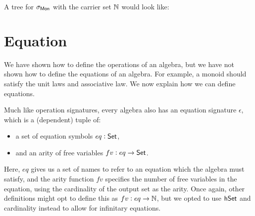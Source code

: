 \begin{example}
A tree for $\sigma_{\mathsf{Mon}}$ with the carrier set $\mathbb{N}$ would look like:
\begin{center}
\hspace{2em}
\end{center}
\end{example}

\section{Equation}\label{sec:universal-algebra:equations}
We have shown how to define the operations of an algebra, but we have not
shown how to define the equations of an algebra. For example, a monoid
should satisfy the unit laws and associative law. We now explain how
we can define equations.

Much like operation signatures, every algebra also has an equation signature
$\epsilon$, which is a (dependent) tuple of:
\begin{itemize}
    \item a set of equation symbols $eq : \mathsf{Set}$,
    \item and an arity of free variables $fv : eq \to \mathsf{Set}$.
\end{itemize}

Here, $eq$ gives us a set of names to refer to an equation which
the algebra must satisfy, and the arity function $fv$ specifies the 
number of free variables in the equation, using the cardinality of the
output set as the arity. Once again, other definitions might opt to
define this as $fv : eq \to \mathbb{N}$, but we opted to use $\mathsf{hSet}$ and
cardinality instead to allow for infinitary equations.

